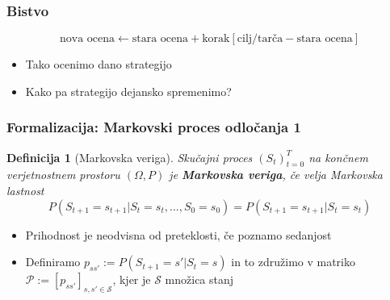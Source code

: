 \documentclass{beamer}    %
\newtheorem{definicija}[izrek]{Definicija}
\begin{document}
\begin{frame}
    \frametitle{Bistvo}
    $$
    \text{nova ocena} \leftarrow \text{stara ocena} + \text{korak} 
    [\text{cilj/tarča} - \text{stara ocena}]
    $$
    \medskip
    \begin{itemize}
        \item Tako ocenimo dano strategijo
        \item Kako pa strategijo dejansko spremenimo?
    \end{itemize}
\end{frame}


\begin{frame}
    \frametitle{Formalizacija: Markovski proces odločanja 1}
    \begin{definicija}[Markovska veriga]
        Skučajni proces $(S_t)_{t=0}^T$ na končnem verjetnostnem prostoru 
        $(\Omega, P)$ je \textbf{Markovska veriga}, če velja Markovska lastnost
        $$
        P(S_{t+1} = s_{t+1} | S_{t} = s_{t}, ..., S_0 = s_0) = P(S_{t+1} = s_{t+1} | S_{t} = s_{t})
        $$
    \end{definicija}
    \pause
    \medskip
    \begin{itemize}
        \item Prihodnost je neodvisna od preteklosti, če poznamo sedanjost
        \pause
        \item Definiramo $p_{ss'} := P(S_{t+1} = s' | S_{t} = s)$ in to združimo v matriko
                $\mathcal{P} := [p_{ss'}]_{s,s'\in \mathcal{S} }$, kjer je $\mathcal{S}$ 
                množica stanj
    \end{itemize}
    
\end{frame}
\end{document}
